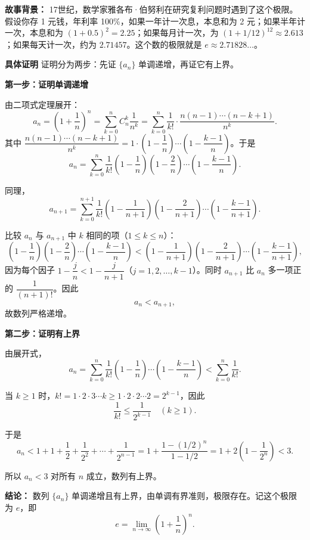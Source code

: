 \documentclass[fontset=fandol]{ctexart}
\newenvironment{custom}[1]{\par\noindent\textbf{#1}\quad}{\par\vspace{0.8em}}
\begin{document}
\textbf{故事背景：} 17世纪，数学家雅各布·伯努利在研究复利问题时遇到了这个极限。假设你存 1 元钱，年利率 100\%，如果一年计一次息，本息和为 2 元；如果半年计一次，本息和为 \((1+0.5)^2 = 2.25\)；如果每月计一次，为 \((1+1/12)^{12} \approx 2.613\)；如果每天计一次，约为 \(2.71457\)。这个数的极限就是 \(e \approx 2.71828\ldots\)。

\begin{custom}{具体证明}
证明分为两步：先证 \(\{a_n\}\) 单调递增，再证它有上界。

\noindent\textbf{第一步：证明单调递增}

由二项式定理展开：
\[
a_n = \left(1+\dfrac{1}{n}\right)^n = \sum_{k=0}^{n} C_n^k \dfrac{1}{n^k} = \sum_{k=0}^{n} \dfrac{1}{k!} \cdot \dfrac{n(n-1)\cdots(n-k+1)}{n^k}.
\]
其中 \(\dfrac{n(n-1)\cdots(n-k+1)}{n^k} = 1 \cdot \left(1-\dfrac{1}{n}\right) \cdots \left(1-\dfrac{k-1}{n}\right)\)。于是
\[
a_n = \sum_{k=0}^{n} \dfrac{1}{k!} \left(1-\dfrac{1}{n}\right)\left(1-\dfrac{2}{n}\right)\cdots\left(1-\dfrac{k-1}{n}\right).
\]

同理，
\[
a_{n+1} = \sum_{k=0}^{n+1} \dfrac{1}{k!} \left(1-\dfrac{1}{n+1}\right)\left(1-\dfrac{2}{n+1}\right)\cdots\left(1-\dfrac{k-1}{n+1}\right).
\]

比较 \(a_n\) 与 \(a_{n+1}\) 中 \(k\) 相同的项（\(1 \leq k \leq n\)）：
\[
\left(1-\dfrac{1}{n}\right)\left(1-\dfrac{2}{n}\right)\cdots\left(1-\dfrac{k-1}{n}\right) < \left(1-\dfrac{1}{n+1}\right)\left(1-\dfrac{2}{n+1}\right)\cdots\left(1-\dfrac{k-1}{n+1}\right),
\]
因为每个因子 \(1-\dfrac{j}{n} < 1-\dfrac{j}{n+1}\)（\(j=1,2,\dots,k-1\)）。同时 \(a_{n+1}\) 比 \(a_n\) 多一项正的 \(\dfrac{1}{(n+1)!}\)。因此
\[
a_n < a_{n+1},
\]
故数列严格递增。

\noindent\textbf{第二步：证明有上界}

由展开式，
\[
a_n = \sum_{k=0}^{n} \dfrac{1}{k!} \left(1-\dfrac{1}{n}\right)\cdots\left(1-\dfrac{k-1}{n}\right) < \sum_{k=0}^{n} \dfrac{1}{k!}.
\]

当 \(k \geq 1\) 时，\(k! = 1 \cdot 2 \cdot 3 \cdots k \geq 1 \cdot 2 \cdot 2 \cdots 2 = 2^{k-1}\)，因此
\[
\dfrac{1}{k!} \leq \dfrac{1}{2^{k-1}} \quad (k \geq 1).
\]

于是
\[
a_n < 1 + 1 + \dfrac{1}{2} + \dfrac{1}{2^2} + \cdots + \dfrac{1}{2^{n-1}} = 1 + \dfrac{1 - (1/2)^n}{1 - 1/2} = 1 + 2\left(1 - \dfrac{1}{2^n}\right) < 3.
\]

所以 \(a_n < 3\) 对所有 \(n\) 成立，数列有上界。

\noindent\textbf{结论：} 数列 \(\{a_n\}\) 单调递增且有上界，由单调有界准则，极限存在。记这个极限为 \(e\)，即
\[
e = \lim_{n\to\infty} \left(1+\dfrac{1}{n}\right)^n.
\]
\end{custom}
\end{document}
